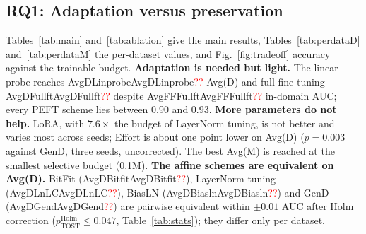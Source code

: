 \documentclass[fonts]{icst}
\newcommand{\num}[1]{\ifcsname #1\endcsname\csname #1\endcsname\else\textcolor{red}{??}\fi}
\begin{document}
\begin{table}[!t]
\centering
\caption{Video AUC of re-trained schemes under one protocol (FF++ c23 training, checkpoint selected on FF++ validation). Avg(D) and Avg(M) are mean $\pm$ std over $n$ seeds; per-dataset values are seed means. Bold: best; shaded: second best.}
\label{tab:main}
\resizebox{\textwidth}{!}{}
\vspace{3mm}
\caption{Ablation of selective and low-rank schemes and of $L_2$ normalization before the classifier (same protocol). Bold: best; shaded: second best.}
\label{tab:ablation}
\resizebox{0.85\textwidth}{!}{}
\end{table}

\subsection{RQ1: Adaptation versus preservation}
\label{sec:main}
Tables~\ref{tab:main} and~\ref{tab:ablation} give the main results, Tables~\ref{tab:perdataD} and~\ref{tab:perdataM} the per-dataset values, and Fig.~\ref{fig:tradeoff} accuracy against the trainable budget.
\textbf{Adaptation is needed but light.} The linear probe reaches \num{AvgDLinprobe} Avg(D) and full fine-tuning \num{AvgDFullft} despite \num{AvgFFFullft} in-domain AUC; every PEFT scheme lies between 0.90 and 0.93.
\textbf{More parameters do not help.} LoRA, with $7.6\times$ the budget of LayerNorm tuning, is not better and varies most across seeds; Effort is about one point lower on Avg(D) ($p=0.003$ against GenD, three seeds, uncorrected). The best Avg(M) is reached at the smallest selective budget (0.1M).
\textbf{The affine schemes are equivalent on Avg(D).} BitFit (\num{AvgDBitfit}), LayerNorm tuning (\num{AvgDLnLC}), BiasLN (\num{AvgDBiasln}) and GenD (\num{AvgDGend}) are pairwise equivalent within $\pm0.01$ AUC after Holm correction ($p^{\mathrm{Holm}}_{\mathrm{TOST}}\le0.047$, Table~\ref{tab:stats}); they differ only per dataset.

\begin{table}[!t]
\centering
\caption{Paired comparisons over the seeds shared by both schemes. $\Delta$: mean difference A$-$B; $p_{\mathrm{Holm}}$: Holm-corrected over the 14 $t$-tests; $p^{\mathrm{Holm}}_{\mathrm{TOST}}$: Holm-corrected equivalence test ($\pm0.01$ AUC; small means equivalent); wins: seeds where A is better. Bold: $<0.05$.}
\label{tab:stats}
\resizebox{\textwidth}{!}{}
\end{table}
\end{document}
